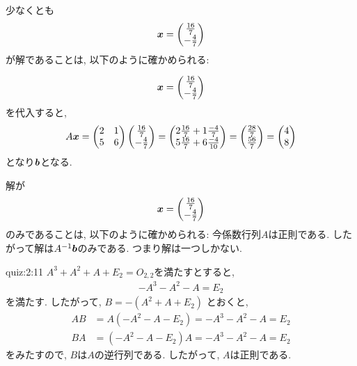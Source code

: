 \begin{checkanswer}%
  少なくとも
  \begin{align*}
    \boldsymbol{x}=
  \begin{pmatrix}
      \frac{16}{7}\\-\frac{4}{7}
  \end{pmatrix}
  \end{align*}
  が解であることは, 以下のように確かめられる:

  \begin{align*}
    \boldsymbol{x}=
  \begin{pmatrix}
    \frac{16}{7}\\-\frac{4}{7}
  \end{pmatrix}
  \end{align*}
  を代入すると,
  \begin{align*}
    A\boldsymbol{x}=
    \begin{pmatrix}
      2&1\\5&6
    \end{pmatrix}
    \begin{pmatrix}
      \frac{16}{7}\\-\frac{4}{7}
    \end{pmatrix}
    =
    \begin{pmatrix}
      2\frac{16}{7}+1\frac{-4}{7}\\5\frac{16}{7}+6\frac{-4}{10}
    \end{pmatrix}
    =
    \begin{pmatrix}
      \frac{28}{7}\\\frac{56}{7}
    \end{pmatrix}
    =
    \begin{pmatrix}
      4\\8
    \end{pmatrix}
  \end{align*}
  となり$\boldsymbol{b}$となる.
\end{checkanswer}
\begin{checkanswer}%
  解が
  \begin{align*}
    \boldsymbol{x}=
  \begin{pmatrix}
      \frac{16}{7}\\-\frac{4}{7}
  \end{pmatrix}
  \end{align*}
  のみであることは, 以下のように確かめられる:
  今係数行列$A$は正則である.
  したがって解は$A^{-1}\boldsymbol{b}$のみである.
  つまり解は一つしかない.
\end{checkanswer}


\begin{answerof}{quiz:2:11}
  $A^3+A^2+A+E_2=O_{2,2}$を満たすとすると,
  \begin{align*}
    -A^3-A^2-A=E_2
  \end{align*}
  を満たす.
  したがって, $B=-(A^2+A+E_2)$
  とおくと,
  \begin{align*}
  AB&=A(-A^2-A-E_2)=-A^3-A^2-A=E_2\\
  BA&=(-A^2-A-E_2)A=-A^3-A^2-A=E_2
  \end{align*}
  をみたすので,
  $B$は$A$の逆行列である.
  したがって, $A$は正則である.
\end{answerof}

